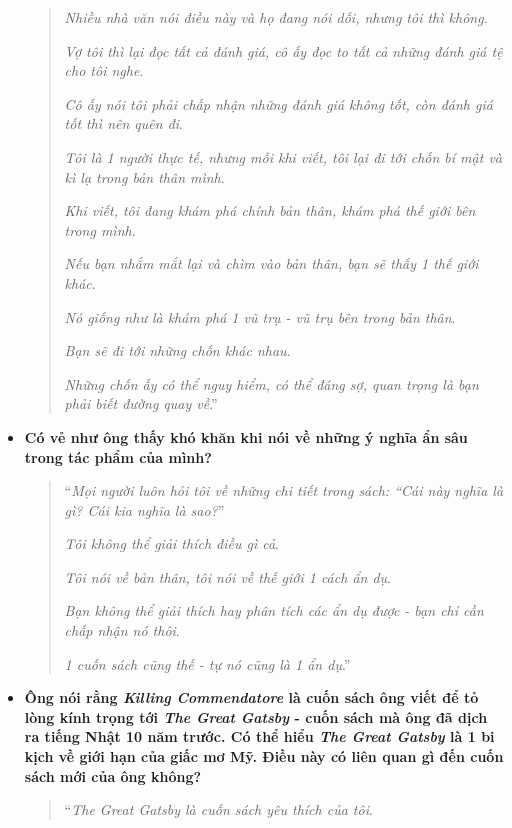 \documentclass{article}
\begin{document}
\begin{itemize}
\begin{quotation}
		\textit{Nhiều nhà văn nói điều này và họ đang nói dối, nhưng tôi thì không}.
		
		\textit{Vợ tôi thì lại đọc tất cả đánh giá, cô ấy đọc to tất cả những đánh giá tệ cho tôi nghe}.
		
		\textit{Cô ấy nói tôi phải chấp nhận những đánh giá không tốt, còn đánh giá tốt thì nên quên đi}.
		
		\textit{Tôi là 1 người thực tế, nhưng mỗi khi viết, tôi lại đi tới chốn bí mật và kì lạ trong bản thân mình}.
		
		\textit{Khi viết, tôi đang khám phá chính bản thân, khám phá thế giới bên trong mình}.
		
		\textit{Nếu bạn nhắm mắt lại và chìm vào bản thân, bạn sẽ thấy 1 thế giới khác}.
		
		\textit{Nó giống như là khám phá 1 vũ trụ - vũ trụ bên trong bản thân}.
		
		\textit{Bạn sẽ đi tới những chốn khác nhau}.
		
		\textit{Những chốn ấy có thể nguy hiểm, có thể đáng sợ, quan trọng là bạn phải biết đường quay về}.''
	\end{quotation}    
	
	\item \textbf{Có vẻ như ông thấy khó khăn khi nói về những ý nghĩa ẩn sâu trong tác phẩm của mình?}
	
	\begin{quotation}
		``\textit{Mọi người luôn hỏi tôi về những chi tiết trong sách: ``\emph{Cái này nghĩa là gì? Cái kia nghĩa là sao?}}''
		
		\textit{Tôi không thể giải thích điều gì cả}.
		
		\textit{Tôi nói về bản thân, tôi nói về thế giới 1 cách ẩn dụ}.
		
		\textit{Bạn không thể giải thích hay phân tích các ẩn dụ được - bạn chỉ cần chấp nhận nó thôi}.
		
		\textit{1 cuốn sách cũng thế - tự nó cũng là 1 ẩn dụ}.''
	\end{quotation}
	
	\item \textbf{Ông nói rằng \textit{Killing Commendatore} là cuốn sách ông viết để tỏ lòng kính trọng tới \textit{The Great Gatsby} - cuốn sách mà ông đã dịch ra tiếng Nhật 10 năm trước. Có thể hiểu \textit{The Great Gatsby} là 1 bi kịch về giới hạn của giấc mơ Mỹ. Điều này có liên quan gì đến cuốn sách mới của ông không?}
	
	\begin{quotation}
		``\textit{The Great Gatsby là cuốn sách yêu thích của tôi}.
		

\end{quotation}
\end{itemize}
\end{document}

